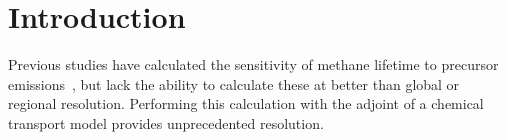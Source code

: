 \section{Introduction}

Previous studies have calculated the sensitivity of methane lifetime to precursor emissions~\citep{ref:holmes2013}, but lack the ability to calculate these at better than global or regional resolution. Performing this calculation with the adjoint of a chemical transport model provides unprecedented resolution.